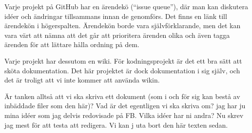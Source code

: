 Varje projekt på GitHub har en ärendekö (``issue queue''), där man kan diskutera idéer och ändringar tillsammans innan de genomförs.
Det finns en länk till ärendekön i högerspalten.
Ärendekön borde vara självförklarande, men det kan vara värt att nämna att det går att prioritera ärenden olika och även tagga ärenden för att lättare hålla ordning på dem.

Varje projekt har dessutom en wiki. För kodningsprojekt är det ett bra sätt att sköta dokumentation.
Det här projektet är dock dokumentation i sig själv, och det är troligt att vi inte kommer att använda wikin.

Är tanken alltså att vi ska skriva ett dokument (som i och för sig kan bestå av inbäddade filer som den här)? Vad är det egentligen vi ska skriva om? jag har ju mina idéer som jag delvis redovisade på FB. Vilka idéer har ni andra? Nu skrev jag mest för att testa att redigera. Vi kan j uta bort den här texten sedan. 
